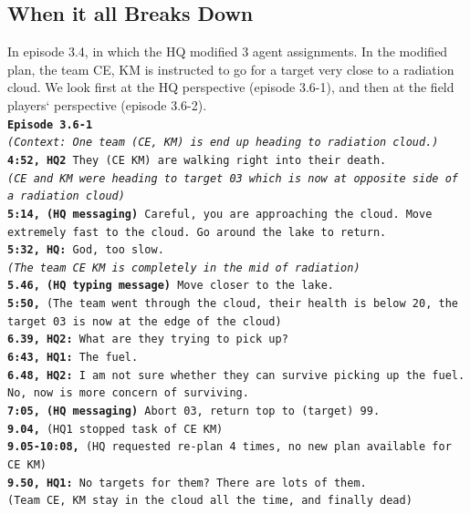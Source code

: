 \subsection{When it all Breaks Down} \label{sec:playerDeath}
In episode 3.4, in which the HQ modified 3 agent assignments. In the modified plan, the team CE, KM is instructed to go for a target very close to a radiation cloud. We look first at the HQ perspective (episode 3.6-1), and then at the field players` perspective (episode 3.6-2).\\

\noindent\texttt{\textbf{Episode 3.6-1}\\
\emph{(Context: One team (CE, KM) is end up heading to radiation cloud.)}\\
\textbf{4:52, HQ2 } They (CE KM) are walking right into their death. \\
\emph{(CE and KM were heading to target 03 which is now at opposite side of a radiation cloud)}\\
\textbf{5:14, (HQ messaging) } Careful, you are approaching the cloud. Move extremely fast to the cloud. Go around the lake to return.\\
\textbf{5:32, HQ: } God, too slow.\\
\emph{(The team CE KM is completely in the mid of radiation)}\\
\textbf{5.46, (HQ typing message) } Move closer to the lake.\\
\textbf{5:50, } (The team went through the cloud, their health is below 20, the target 03 is now at the edge of the cloud)\\
\textbf{6.39, HQ2: } What are they trying to pick up?\\
\textbf{6:43, HQ1: } The fuel.\\
\textbf{6.48, HQ2: } I am not sure whether they can survive picking up the fuel. No, now is more concern of surviving. \\
\textbf{7:05, (HQ messaging) } Abort 03, return top to (target) 99. \\
\textbf{9.04, } (HQ1 stopped task of CE KM) \\
\textbf{9.05-10:08, } (HQ requested re-plan 4 times, no new plan available for CE KM) \\
\textbf{9.50, HQ1: } No targets for them? There are lots of them. \\
(Team CE, KM stay in the cloud all the time, and finally dead)\\
}

